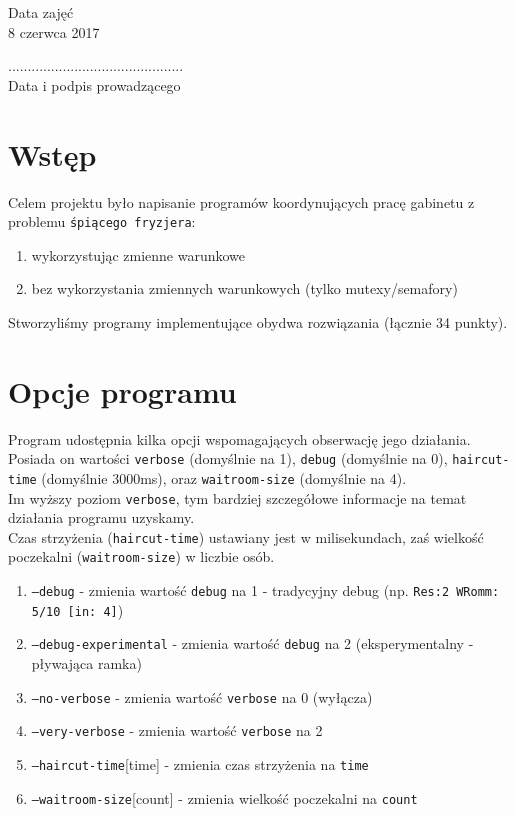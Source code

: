 \documentclass[12pt,a4paper]{article}
\newcommand{\datazajec}{8 czerwca 2017}
\begin{document}
	\begin{minipage}[t]{0.4\linewidth}
		\centering
		Data zajęć \\
		\small \datazajec
	\end{minipage}
	
	\begin{flushright}
		\begin{minipage}[t]{0.5\linewidth}
			\centering
			............................................. \\
			\small \textsf{Data i podpis prowadzącego}
		\end{minipage}
	\end{flushright}
	\pagebreak
	
	\section{Wstęp}
	Celem projektu było napisanie programów koordynujących pracę
	gabinetu z problemu \texttt{śpiącego fryzjera}:
	\begin{enumerate}[label=\alph*)]
		\item wykorzystując zmienne warunkowe
		\item bez wykorzystania zmiennych warunkowych (tylko 
			mutexy/semafory)
	\end{enumerate}
	
	Stworzyliśmy programy implementujące obydwa rozwiązania (łącznie
	34 punkty).
	
	\section{Opcje programu}
	Program udostępnia kilka opcji wspomagających obserwację jego
	działania. Posiada on wartości \texttt{verbose} (domyślnie na 1), 
	\texttt{debug} (domyślnie na 0), \texttt{haircut-time} (domyślnie
	3000ms), oraz \texttt{waitroom-size} (domyślnie na 4). \\
	Im wyższy poziom \texttt{verbose}, tym bardziej szczegółowe 
	informacje na temat działania programu uzyskamy. \\
	Czas strzyżenia (\texttt{haircut-time}) ustawiany jest w 
	milisekundach, zaś wielkość poczekalni (\texttt{waitroom-size}) w
	liczbie osób.
	\begin{enumerate}
		\item \texttt{--debug} - zmienia wartość \texttt{debug} na 1 - 
			tradycyjny debug (np. \texttt{Res:2 WRomm: 5/10 [in: 4]})
		\item \texttt{--debug-experimental} - zmienia wartość
			\texttt{debug} na 2 (eksperymentalny - pływająca ramka)
		\item \texttt{--no-verbose} - zmienia wartość \texttt{verbose}
			na 0 (wyłącza)
		\item \texttt{--very-verbose} - zmienia wartość \texttt{verbose}
			na 2
		\item \texttt{--haircut-time}[time] - zmienia czas strzyżenia na
			\texttt{time}
		\item \texttt{--waitroom-size}[count] - zmienia wielkość
			poczekalni na \texttt{count}
	\end{enumerate}
	
\end{document}
